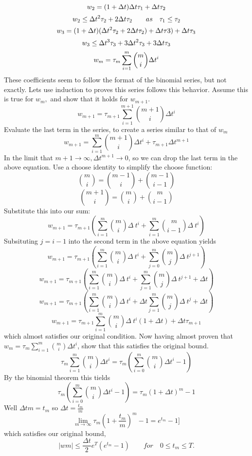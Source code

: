 \documentclass{article}
\begin{document}
$$
w_{2} = (1+ \Delta t)\Delta t \tau_{1} +\Delta t \tau_{2}\\
$$
$$
w_{2} \le \Delta t^2\tau_{2} +2\Delta t \tau_{2}\qquad as\quad \tau_{1} \le \tau_{2}\\
$$
$$
w_{3} = (1+\Delta t)(\Delta t^2 \tau_{2} +2\Delta t \tau_{2}) +\Delta t \tau{3} ) +\Delta t \tau_{3}\\
$$
$$
w_{3} \le \Delta t^3 \tau_{3} + 3\Delta t^2\tau_{3} +3\Delta t \tau_{3}\\
$$
$$
w_{m} = \tau_{m}\sum_{i=1}^{m} {m \choose i} \Delta t^i\\
$$
These coefficients seem to follow the format of the binomial series, but not exactly. Lets use induction to proves this series follows this behavior. Assume this is true for $w_{m},$ and show that it holds for $w_{m+1}$.
$$
w_{m+1} =\tau_{m+1} \sum_{i=1}^{m+1}{m+1 \choose i} \Delta t^i
$$
Evaluate the last term in the series, to create a series similar to that of $w_{m}$
$$
w_{m+1} = \sum_{i=1}^{m}{m+1 \choose i} \Delta t^i +\tau_{m+1}\Delta t^{m+1}
$$
In the limit that $m+1 \to \infty, \Delta t^{m+1} \to 0$, so we can drop the last term in the above equation.
Use a choose identity to simplify the choose function:
\[ {m \choose i} = {m -1 \choose i} + {m-1 \choose i-1}\]
\[ {m+1 \choose i } = {m \choose i} + { m \choose i-1}\]
Substitute this into our sum:
$$
w_{m+1} =\tau_{m+1}( \sum_{i=1}^{m} {m \choose i}\Delta\ t^i +\sum_{i=1}^{m} { m \choose i-1}\Delta\ t^i)
$$
Subsituting $j = i-1$ into the second term in the above equation yields
\[w_{m+1} =\tau_{m+1}( \sum_{i=1}^{m} {m \choose i}\Delta\ t^i +\sum_{j=0}^{m} { m \choose j}\Delta\ t^{j+1})\]
\[w_{m+1} =\tau_{m+1}( \sum_{i=1}^{m} {m \choose i}\Delta\ t^i +\sum_{j=1}^{m} { m \choose j}\Delta\ t^{j+1} +\Delta t)\]
\[w_{m+1} =\tau_{m+1}( \sum_{i=1}^{m} {m \choose i}\Delta\ t^i +\Delta t\sum_{j=1}^{m} { m \choose j}\Delta\ t^{j} +\Delta t)\]
 \[w_{m+1} = \tau_{m+1}\sum_{i=1}^{m} {m \choose i}\Delta\ t^i (1+\Delta t) + \Delta t \tau_{m+1}\]
which almost satisfies our original condition.
Now having almost proven that $w_{m} =\tau_{m}\sum_{i=1}^{m} {m \choose i} \Delta t^i$, show that this satisfies the original bound.
\[ \tau_{m}\sum_{i=1}^{m} {m \choose i} \Delta t^i =\tau_{m}(\sum_{i=0}^{m} {m \choose i} \Delta t^i -1)\]
By the binomial theorem this tields
\[\tau_{m}(\sum_{i=0}^{m} {m \choose i} \Delta t^i -1) = \tau_{m}(1+\Delta t)^m -1\]
Well $\Delta tm = t_{m}$ so $ \Delta t = \frac{t_{m}}{m}$
\[ \lim_{ m \to \infty}\tau_{m}(1+ \frac{t_{m}}{m})^m -1 = e^{t_{m}}-1]\]
which satisfies our original bound,
\[ |wm| \le \frac{\Delta t}{2}e^T(e^{t_{m}}-1)\qquad for\quad 0\le t_{m} \le T.\]
\normalsize
\end{document}
